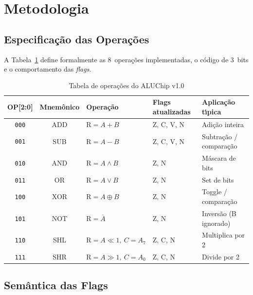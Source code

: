 \documentclass[12pt,a4paper]{article}
\begin{document}
\section{Metodologia}

\subsection{Especifica\c{c}\~{a}o das Opera\c{c}\~{o}es}

A Tabela~\ref{tab:ops} define formalmente as 8~opera\c{c}\~{o}es implementadas, o c\'{o}digo de 3~bits e o comportamento das \textit{flags}.

\begin{table}[h!]
\centering
\caption{Tabela de opera\c{c}\~{o}es do ALUChip v1.0}
\label{tab:ops}
\begin{tabular}{c c l l l}
\toprule
\textbf{OP[2:0]} & \textbf{Mnem\^{o}nico} & \textbf{Opera\c{c}\~{a}o} & \textbf{Flags atualizadas} & \textbf{Aplica\c{c}\~{a}o t\'{\i}pica} \\
\midrule
\texttt{000} & ADD  & $\text{R} = A + B$         & Z, C, V, N & Adi\c{c}\~{a}o inteira \\
\texttt{001} & SUB  & $\text{R} = A - B$         & Z, C, V, N & Subtra\c{c}\~{a}o / compara\c{c}\~{a}o \\
\texttt{010} & AND  & $\text{R} = A \land B$     & Z, N       & M\'{a}scara de bits \\
\texttt{011} & OR   & $\text{R} = A \lor B$      & Z, N       & Set de bits \\
\texttt{100} & XOR  & $\text{R} = A \oplus B$    & Z, N       & Toggle / compara\c{c}\~{a}o \\
\texttt{101} & NOT  & $\text{R} = \overline{A}$  & Z, N       & Invers\~{a}o (B ignorado) \\
\texttt{110} & SHL  & $\text{R} = A \ll 1,\ C = A_7$ & Z, C, N  & Multiplica por 2 \\
\texttt{111} & SHR  & $\text{R} = A \gg 1,\ C = A_0$ & Z, C, N  & Divide por 2 \\
\bottomrule
\end{tabular}
\end{table}

\subsection{Sem\^{a}ntica das Flags}
\end{document}
